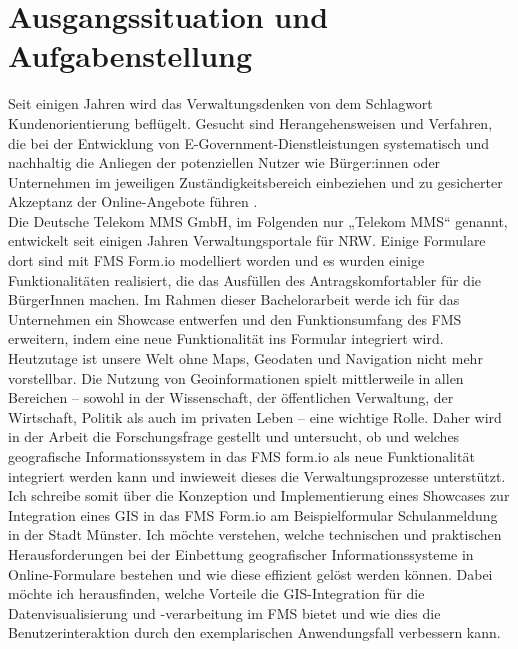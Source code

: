 \section{Ausgangssituation und Aufgabenstellung}
\label{sec:forschung}

Seit einigen Jahren wird das Verwaltungsdenken von dem Schlagwort Kundenorientierung beflügelt. Gesucht sind Herangehensweisen und Verfahren, die bei der Entwicklung von E-Government-Dienstleistungen systematisch und nachhaltig die Anliegen der potenziellen Nutzer wie Bürger:innen oder Unternehmen im jeweiligen Zuständigkeitsbereich einbeziehen und zu gesicherter Akzeptanz der Online-Angebote führen \citep{bleek_steuerungsmodell_2005}.\\

Die Deutsche Telekom MMS GmbH, im Folgenden nur „Telekom MMS“ genannt, entwickelt seit einigen Jahren Verwaltungsportale für NRW. Einige Formulare dort sind mit FMS Form.io modelliert worden und es wurden einige Funktionalitäten realisiert, die das Ausfüllen des Antragskomfortabler für die BürgerInnen machen. Im Rahmen dieser Bachelorarbeit werde ich für das Unternehmen ein Showcase entwerfen und den Funktionsumfang des FMS erweitern, indem eine neue Funktionalität ins Formular integriert wird.\\

Heutzutage ist unsere Welt ohne Maps, Geodaten und Navigation nicht mehr vorstellbar. Die Nutzung von Geoinformationen spielt mittlerweile in allen Bereichen – sowohl in der Wissenschaft, der öffentlichen Verwaltung, der Wirtschaft, Politik als auch im privaten Leben – eine wichtige Rolle. Daher wird in der Arbeit die Forschungsfrage gestellt und untersucht, ob und welches geografische Informationssystem in das FMS form.io als neue Funktionalität integriert werden kann und inwieweit dieses die Verwaltungsprozesse unterstützt.\\

Ich schreibe somit über die Konzeption und Implementierung eines Showcases zur Integration eines GIS in das FMS Form.io am Beispielformular Schulanmeldung in der Stadt Münster. Ich möchte verstehen, welche technischen und praktischen Herausforderungen bei der Einbettung geografischer Informationssysteme in Online-Formulare bestehen und wie diese effizient gelöst werden können. Dabei möchte ich herausfinden, welche Vorteile die GIS-Integration für die Datenvisualisierung und -verarbeitung im FMS bietet und wie dies die Benutzerinteraktion durch den exemplarischen Anwendungsfall verbessern kann.